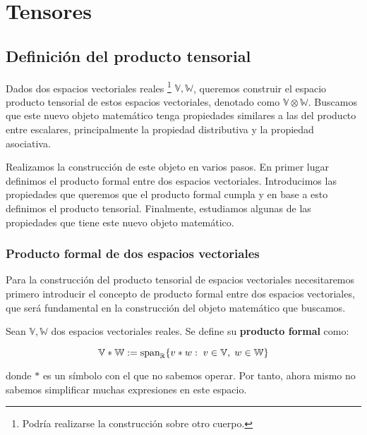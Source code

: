\section{Tensores}

\subsection{Definición del producto tensorial} \label{sec:deftensor}

Dados dos espacios vectoriales reales \footnote{Podría realizarse la construcción sobre otro cuerpo.} $\mathbb{V}, \mathbb{W}$, queremos construir el espacio producto tensorial de estos espacios vectoriales, denotado como $\mathbb{V} \otimes \mathbb{W}$. Buscamos que este nuevo objeto matemático tenga propiedades similares a las del producto entre escalares, principalmente la propiedad distributiva y la propiedad asociativa.

Realizamos la construcción de este objeto en varios pasos. En primer lugar definimos el producto formal entre dos espacios vectoriales. Introducimos las propiedades que queremos que el producto formal cumpla y en base a esto definimos el producto tensorial. Finalmente, estudiamos algunas de las propiedades que tiene este nuevo objeto matemático.

\subsubsection{Producto formal de dos espacios vectoriales}

Para la construcción del producto tensorial de espacios vectoriales necesitaremos primero introducir el concepto de producto formal entre dos espacios vectoriales, que será fundamental en la construcción del objeto matemático que buscamos.

\begin{definicion}
	Sean $\mathbb{V}, \mathbb{W}$ dos espacios vectoriales reales. Se define su \textbf{producto formal} como:

	\begin{equation}
		\mathbb{V} \ast \mathbb{W} := \text{span}_{\mathbb{R}} \{ v \ast w : \; v \in \mathbb{V}, \; w \in \mathbb{W} \}
	\end{equation}

	donde $*$ es un símbolo con el que no sabemos operar. Por tanto, ahora mismo no sabemos simplificar muchas expresiones en este espacio.
\end{definicion}

